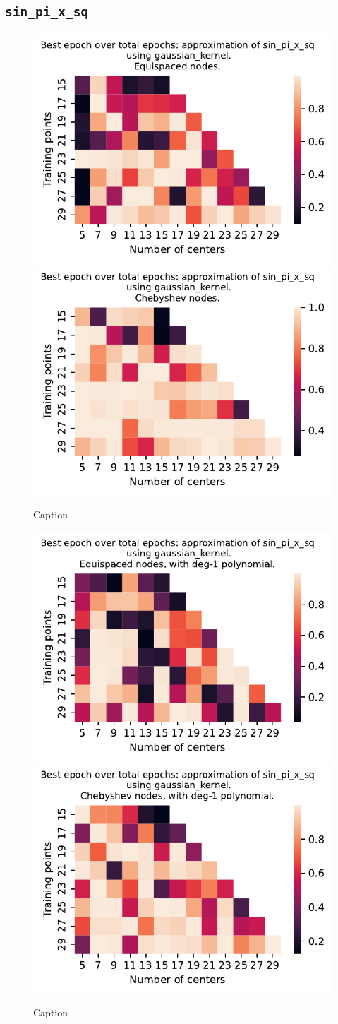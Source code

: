 \documentclass[12pt]{report} %
\begin{document}
\subsection*{\texttt{sin\_pi\_x\_sq}}

\begin{figure}[ht]
  \centering

  \includegraphics[width=.49\textwidth]{imagenes/experiments/1d/variational_epochs/sin_pi_x_sq-Kgaussian_kernel-Equi-epochs.pdf}
  \includegraphics[width=.49\textwidth]{imagenes/experiments/1d/variational_epochs/sin_pi_x_sq-Kgaussian_kernel-Cheb-epochs.pdf}
  \caption{Caption}
  \label{fig:epochs-sin-pi-x-sq-gaussian}
\end{figure}

\begin{figure}[ht]
  \centering

  \includegraphics[width=.49\textwidth]{imagenes/experiments/1d/variational_epochs/sin_pi_x_sq-Kgaussian_kernel-Poly-Equi-epochs.pdf}
  \includegraphics[width=.49\textwidth]{imagenes/experiments/1d/variational_epochs/sin_pi_x_sq-Kgaussian_kernel-Poly-Cheb-epochs.pdf}
  \caption{Caption}
  \label{fig:epochs-sin-pi-x-sq-gaussian-poly}
\end{figure}
\end{document}
